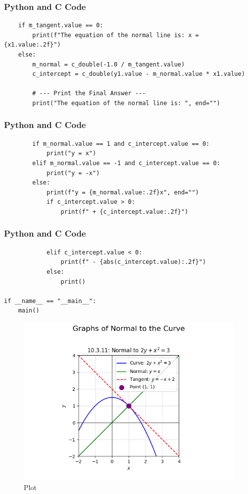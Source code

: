 \documentclass{beamer}
\begin{document}
\begin{frame}[fragile]
\frametitle{Python and C Code}
\begin{lstlisting}
    if m_tangent.value == 0:
        print(f"The equation of the normal line is: x = {x1.value:.2f}")
    else:
        m_normal = c_double(-1.0 / m_tangent.value)
        c_intercept = c_double(y1.value - m_normal.value * x1.value)

        # --- Print the Final Answer ---
        print("The equation of the normal line is: ", end="")
\end{lstlisting}
\end{frame}

\begin{frame}[fragile]
\frametitle{Python and C Code}
\begin{lstlisting}
        if m_normal.value == 1 and c_intercept.value == 0:
            print("y = x")
        elif m_normal.value == -1 and c_intercept.value == 0:
            print("y = -x")
        else:
            print(f"y = {m_normal.value:.2f}x", end="")
            if c_intercept.value > 0:
                print(f" + {c_intercept.value:.2f}")
\end{lstlisting}
\end{frame}

\begin{frame}[fragile]
\frametitle{Python and C Code}
\begin{lstlisting}
            elif c_intercept.value < 0:
                print(f" - {abs(c_intercept.value):.2f}")
            else:
                print()

if __name__ == "__main__":
    main()

\end{lstlisting}
\end{frame}
\begin{frame}
\begin{figure}[H]
    \centering
    \includegraphics[width=0.75\columnwidth]{graph-17.png}
    \caption{Plot}
    \label{fig:placeholder}
\end{figure}
\end{frame}
\end{document}
